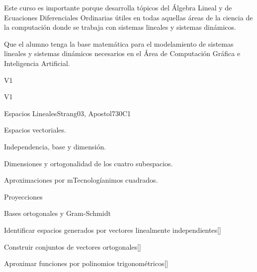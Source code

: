 \begin{syllabus}


\begin{justification}
Este curso es importante porque desarrolla tópicos del Álgebra Lineal y de Ecuaciones Diferenciales Ordinarias útiles en todas aquellas áreas de la ciencia de la computación donde se trabaja con sistemas lineales y sistemas dinámicos.
\end{justification}

\begin{goals}
\item Que el alumno tenga la base matemática para el modelamiento de sistemas lineales y sistemas dinámicos necesarios en el Área de Computación Gráfica e Inteligencia Artificial.
\end{goals}

\begin{outcomes}{V1}
  \item {}
  \item {}
  \item {}
\end{outcomes}

\begin{competences}{V1}
    \item {} 
    \item {}
    \item {}
\end{competences}

\begin{unit}{Espacios Lineales}{}{Strang03, Apostol73}{0}{C1}
\begin{topics}
      \item Espacios vectoriales.
      \item Independencia, base y dimensión.
      \item Dimensiones y ortogonalidad de los cuatro subespacios.
      \item Aproximaciones por mTecnologíanimos cuadrados.
      \item Proyecciones
      \item Bases ortogonales y Gram-Schmidt
   \end{topics}
   \begin{learningoutcomes}
      \item Identificar espacios generados por vectores linealmente independientes[\Usage]
      \item Construir conjuntos de vectores ortogonales[\Usage]
      \item Aproximar funciones por polinomios trigonométricos[\Usage]
   \end{learningoutcomes}
\end{unit}


\end{syllabus}
